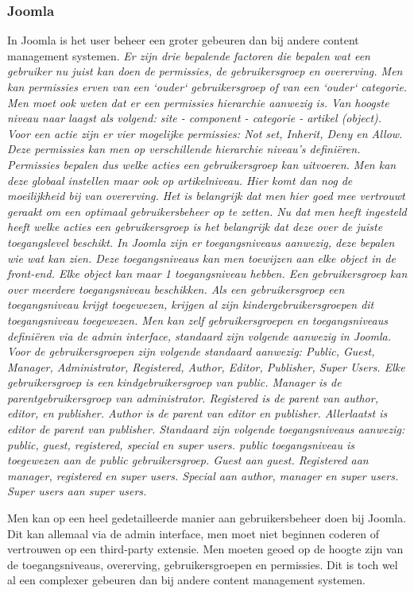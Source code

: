 \subsubsection{Joomla}
In Joomla is het user beheer een groter gebeuren dan bij andere content management systemen.\textit{ Er zijn drie bepalende factoren die bepalen wat een gebruiker nu juist kan doen de permissies, de gebruikersgroep en overerving. Men kan permissies erven van een `ouder` gebruikersgroep of van een `ouder` categorie. Men moet ook weten dat er een permissies hierarchie aanwezig is. Van hoogste niveau naar laagst als volgend: site - component - categorie - artikel (object). Voor een actie zijn er vier mogelijke permissies: Not set, Inherit, Deny en Allow. Deze permissies kan men op verschillende hierarchie niveau's definiëren. Permissies bepalen dus welke acties een gebruikersgroep kan uitvoeren. Men kan deze globaal instellen maar ook op artikelniveau. Hier komt dan nog de moeilijkheid bij van overerving. Het is belangrijk dat men hier goed mee vertrouwt geraakt om een optimaal gebruikersbeheer op te zetten. Nu dat men heeft ingesteld heeft welke acties een gebruikersgroep is het belangrijk dat deze over de juiste toegangslevel beschikt. In Joomla zijn er toegangsniveaus aanwezig, deze bepalen wie wat kan zien. Deze toegangsniveaus kan men toewijzen aan elke object in de front-end. Elke object kan maar 1 toegangsniveau hebben. Een gebruikersgroep kan over meerdere toegangsniveau beschikken. Als een gebruikersgroep een toegangsniveau krijgt toegewezen, krijgen al zijn kindergebruikersgroepen dit toegangsniveau toegewezen. Men kan zelf gebruikersgroepen en toegangsniveaus definiëren via de admin interface, standaard zijn volgende aanwezig in Joomla. Voor de gebruikersgroepen zijn volgende standaard aanwezig: Public, Guest, Manager, Administrator, Registered, Author, Editor, Publisher, Super Users. Elke gebruikersgroep is een kindgebruikersgroep van public. Manager is de parentgebruikersgroep van administrator. Registered is de parent van author, editor, en publisher. Author is de parent van editor en publisher. Allerlaatst is editor de parent van publisher. Standaard zijn volgende toegangsniveaus aanwezig: public, guest, registered, special en super users. public toegangsniveau is toegewezen aan de public gebruikersgroep. Guest aan guest. Registered aan manager, registered en super users. Special aan author, manager en super users. Super users aan super users.} \autocite{JoomlaCommunity2019c} 

Men kan op een heel gedetailleerde manier aan gebruikersbeheer doen bij Joomla. Dit kan allemaal via de admin interface, men moet niet beginnen coderen of vertrouwen op een third-party extensie. Men moeten geoed op de hoogte zijn van de toegangsniveaus, overerving, gebruikersgroepen en permissies. Dit is toch wel al een complexer gebeuren dan bij andere content management systemen.
